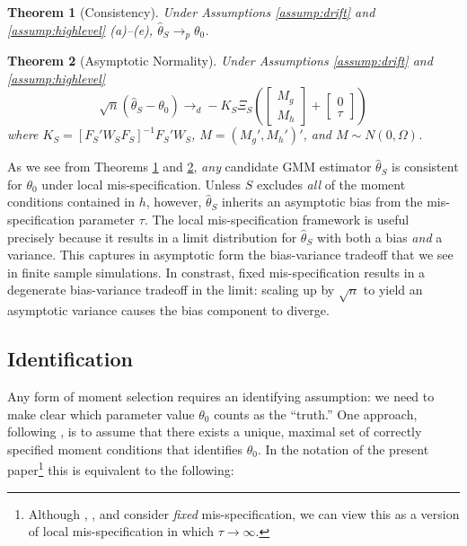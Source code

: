 \documentclass[12pt]{article}
\newtheorem{thm}{Theorem}[section]
\theoremstyle{definition}
\begin{document}
\begin{thm}[Consistency]
\label{thm:consist}
Under Assumptions \ref{assump:drift} and \ref{assump:highlevel} (a)--(e), $\widehat{\theta}_S \rightarrow_{p} \theta_0$.
\end{thm}

\begin{thm}[Asymptotic Normality]
\label{thm:normality}
Under Assumptions \ref{assump:drift} and \ref{assump:highlevel}
$$\sqrt{n}(\widehat{\theta}_S - \theta_0 ) \rightarrow_d -K_S \Xi_S  \left(\left[\begin{array}
	{c} M_g \\ M_h
\end{array} \right]  + \left[\begin{array}
	{c} 0 \\ \tau
\end{array} \right]\right)$$
where $K_S  = [F_S'W_SF_S]^{-1} F_S'W_S$, $M = (M_g', M_h')'$, and $M \sim N(0,\Omega)$.
\end{thm}

As we see from Theorems \ref{thm:consist} and \ref{thm:normality}, \emph{any} candidate GMM estimator $\widehat{\theta}_S$ is consistent for $\theta_0$ under local mis-specification. 
Unless $S$ excludes \emph{all} of the moment conditions contained in $h$, however, $\widehat{\theta}_S$ inherits an asymptotic bias from the mis-specification parameter $\tau$. 
The local mis-specification framework is useful precisely because it results in a limit distribution for $\widehat{\theta}_S$ with both a bias \emph{and} a variance. 
This captures in asymptotic form the bias-variance tradeoff that we see in finite sample simulations.
In constrast, fixed mis-specification results in a degenerate bias-variance tradeoff in the limit: scaling up by $\sqrt{n}$ to yield an asymptotic variance causes the bias component to diverge.

\subsection{Identification}
Any form of moment selection requires an identifying assumption: we need to make clear which parameter value $\theta_0$ counts as the ``truth.''
One approach, following \cite{Andrews1999}, is to assume that there exists a unique, maximal set of correctly specified moment conditions that identifies $\theta_0$. 
In the notation of the present paper\footnote{Although \cite{Andrews1999}, \cite{AndrewsLu}, and \cite{HongPrestonShum} consider \emph{fixed} mis-specification, we can view this as a version of local mis-specification in which $\tau \rightarrow \infty$.} this is equivalent to the following:
\end{document}
